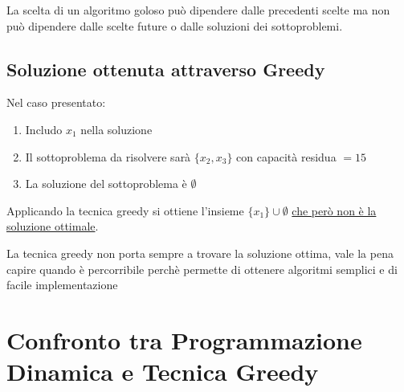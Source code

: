 La scelta di un algoritmo goloso può dipendere dalle precedenti scelte ma non può dipendere dalle scelte future o dalle soluzioni dei sottoproblemi.

\subsection{Soluzione ottenuta attraverso Greedy}
Nel caso presentato:
\begin{enumerate}
    \item Includo $x_1$ nella soluzione
    \item Il sottoproblema da risolvere sarà $\{x_2, x_3\}$ con capacità residua $= 15$
    \item La soluzione del sottoproblema è $\emptyset$
\end{enumerate}

Applicando la tecnica greedy si ottiene l'insieme $\{x_1\} \cup \emptyset$ \uline{che però non è la soluzione ottimale}.


La tecnica greedy non porta sempre a trovare la soluzione ottima, vale la pena capire quando è percorribile perchè permette di ottenere algoritmi semplici e di facile implementazione

\section{Confronto  tra Programmazione Dinamica e Tecnica Greedy}

